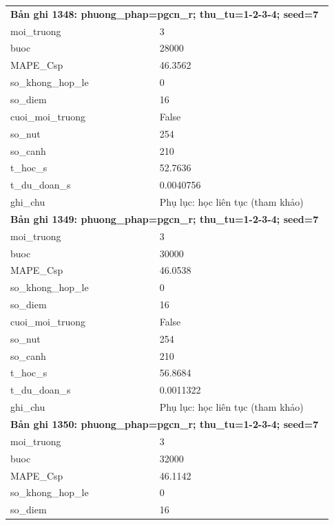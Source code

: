 \begin{longtable}{p{0.43\linewidth}p{0.50\linewidth}}
\midrule
\multicolumn{2}{p{0.95\linewidth}}{\textbf{Bản ghi 1348: phuong\_phap=pgcn\_r; thu\_tu=1-2-3-4; seed=7}} \\
moi\_\allowbreak truong & 3 \\
buoc & 28000 \\
MAPE\_\allowbreak Csp & 46.3562 \\
so\_\allowbreak khong\_\allowbreak hop\_\allowbreak le & 0 \\
so\_\allowbreak diem & 16 \\
cuoi\_\allowbreak moi\_\allowbreak truong & False \\
so\_\allowbreak nut & 254 \\
so\_\allowbreak canh & 210 \\
t\_\allowbreak hoc\_\allowbreak s & 52.7636 \\
t\_\allowbreak du\_\allowbreak doan\_\allowbreak s & 0.0040756 \\
ghi\_\allowbreak chu & Phụ lục: học liên tục (tham khảo) \\
\midrule
\multicolumn{2}{p{0.95\linewidth}}{\textbf{Bản ghi 1349: phuong\_phap=pgcn\_r; thu\_tu=1-2-3-4; seed=7}} \\
moi\_\allowbreak truong & 3 \\
buoc & 30000 \\
MAPE\_\allowbreak Csp & 46.0538 \\
so\_\allowbreak khong\_\allowbreak hop\_\allowbreak le & 0 \\
so\_\allowbreak diem & 16 \\
cuoi\_\allowbreak moi\_\allowbreak truong & False \\
so\_\allowbreak nut & 254 \\
so\_\allowbreak canh & 210 \\
t\_\allowbreak hoc\_\allowbreak s & 56.8684 \\
t\_\allowbreak du\_\allowbreak doan\_\allowbreak s & 0.0011322 \\
ghi\_\allowbreak chu & Phụ lục: học liên tục (tham khảo) \\
\midrule
\multicolumn{2}{p{0.95\linewidth}}{\textbf{Bản ghi 1350: phuong\_phap=pgcn\_r; thu\_tu=1-2-3-4; seed=7}} \\
moi\_\allowbreak truong & 3 \\
buoc & 32000 \\
MAPE\_\allowbreak Csp & 46.1142 \\
so\_\allowbreak khong\_\allowbreak hop\_\allowbreak le & 0 \\
so\_\allowbreak diem & 16 \\

\end{longtable}
